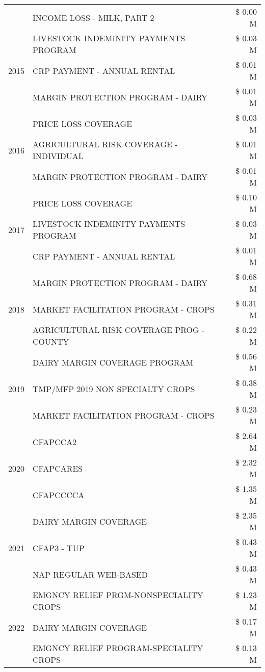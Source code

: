 \begin{tabular}{llr}
 & INCOME LOSS - MILK, PART 2 & \$ 0.00 M \\
\cline{1-3}
\multirow[t]{3}{*}{2015} & LIVESTOCK INDEMINITY PAYMENTS PROGRAM & \$ 0.03 M \\
 & CRP PAYMENT - ANNUAL RENTAL & \$ 0.01 M \\
 & MARGIN PROTECTION PROGRAM - DAIRY & \$ 0.01 M \\
\cline{1-3}
\multirow[t]{3}{*}{2016} & PRICE LOSS COVERAGE & \$ 0.03 M \\
 & AGRICULTURAL RISK COVERAGE - INDIVIDUAL & \$ 0.01 M \\
 & MARGIN PROTECTION PROGRAM - DAIRY & \$ 0.01 M \\
\cline{1-3}
\multirow[t]{3}{*}{2017} & PRICE LOSS COVERAGE & \$ 0.10 M \\
 & LIVESTOCK INDEMINITY PAYMENTS PROGRAM & \$ 0.03 M \\
 & CRP PAYMENT - ANNUAL RENTAL & \$ 0.01 M \\
\cline{1-3}
\multirow[t]{3}{*}{2018} & MARGIN PROTECTION PROGRAM - DAIRY & \$ 0.68 M \\
 & MARKET FACILITATION PROGRAM - CROPS & \$ 0.31 M \\
 & AGRICULTURAL RISK COVERAGE PROG - COUNTY & \$ 0.22 M \\
\cline{1-3}
\multirow[t]{3}{*}{2019} & DAIRY MARGIN COVERAGE PROGRAM & \$ 0.56 M \\
 & TMP/MFP 2019 NON SPECIALTY CROPS & \$ 0.38 M \\
 & MARKET FACILITATION PROGRAM - CROPS & \$ 0.23 M \\
\cline{1-3}
\multirow[t]{3}{*}{2020} & CFAPCCA2 & \$ 2.64 M \\
 & CFAPCARES & \$ 2.32 M \\
 & CFAPCCCCA & \$ 1.35 M \\
\cline{1-3}
\multirow[t]{3}{*}{2021} & DAIRY MARGIN COVERAGE & \$ 2.35 M \\
 & CFAP3 - TUP & \$ 0.43 M \\
 & NAP REGULAR WEB-BASED & \$ 0.43 M \\
\cline{1-3}
\multirow[t]{3}{*}{2022} & EMGNCY RELIEF PRGM-NONSPECIALITY CROPS & \$ 1.23 M \\
 & DAIRY MARGIN COVERAGE & \$ 0.17 M \\
 & EMGNCY RELIEF PROGRAM-SPECIALITY CROPS & \$ 0.13 M \\
\cline{1-3}
\bottomrule
\end{tabular}
